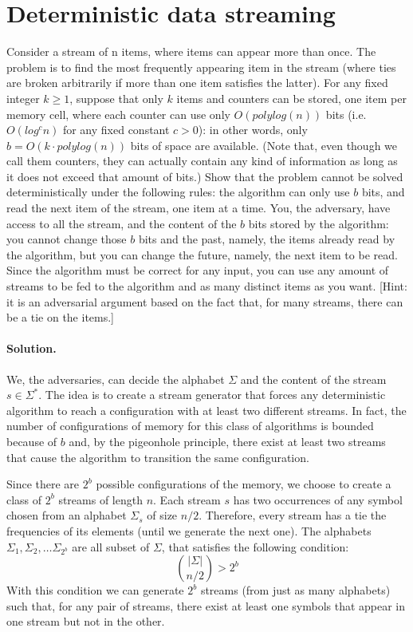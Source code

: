 \section{Deterministic data streaming}

Consider a stream of n items, where items can appear more than once. The problem is to find the most frequently appearing item in the stream (where ties are broken arbitrarily if more than one item satisfies the latter). For any fixed integer $k \geq 1$, suppose that only $k$ items and counters can be stored, one item per memory cell, where each counter can use only $O(polylog(n))$ bits (i.e. $O(log^c n)$ for any fixed constant $c > 0$): in other words, only $b = O(k\cdot polylog(n))$ bits of space are available. (Note that, even though we call them counters, they can actually contain any kind of information as long as it does not exceed that amount of bits.)
Show that the problem cannot be solved deterministically under the following rules: the algorithm can only use $b$ bits, and read the next item of the stream, one item at a time. You, the adversary, have access to all the stream, and the content of the $b$ bits stored by the algorithm: you cannot change those $b$ bits and the past, namely, the items already read by the algorithm, but you can change the future, namely, the next item to be read. Since the algorithm must be correct for any input, you can use any amount of streams to be fed to the algorithm and as many distinct items as you want. [Hint: it is an adversarial argument based on the fact that, for many streams, there can be a tie on the items.]

\vspace{0.5cm}
\paragraph{Solution.} We, the adversaries, can decide the alphabet $\Sigma$ and the content of the stream $s\in \Sigma^*$. The idea is to create a stream generator that forces any deterministic algorithm to reach a configuration with at least two different streams. In fact, the number of configurations of memory for this class of algorithms is bounded because of $b$ and, by the pigeonhole principle, there exist at least two streams that cause the algorithm to transition the same configuration.

Since there are $2^b$ possible configurations of the memory, we choose to create a class of $2^b$ streams of length $n$. Each stream $s$ has two occurrences of any symbol chosen from an alphabet $\Sigma_s$ of size $n/2$. Therefore, every stream has a tie the frequencies of its elements (until we generate the next one). The alphabets $\Sigma_1, \Sigma_2, \dots \Sigma_{2^b}$ are all subset of $\Sigma$, that satisfies the following condition:
$${|\Sigma| \choose n/2} > 2^b$$
With this condition we can generate $2^b$ streams (from just as many alphabets) such that, for any pair of streams, there exist at least one symbols that appear in one stream but not in the other.

